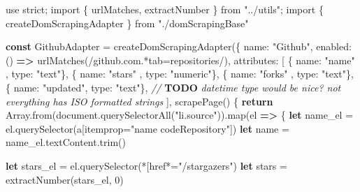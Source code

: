 \documentclass[sigplan,10pt,anonymous,review]{acmart}
\newenvironment{Shaded}{}{}
\newcommand{\AlertTok}[1]{\textcolor[rgb]{1.00,0.00,0.00}{\textbf{#1}}}
\newcommand{\AttributeTok}[1]{\textcolor[rgb]{0.49,0.56,0.16}{#1}}
\newcommand{\CommentTok}[1]{\textcolor[rgb]{0.38,0.63,0.69}{\textit{#1}}}
\newcommand{\ControlFlowTok}[1]{\textcolor[rgb]{0.00,0.44,0.13}{\textbf{#1}}}
\newcommand{\DataTypeTok}[1]{\textcolor[rgb]{0.56,0.13,0.00}{#1}}
\newcommand{\DecValTok}[1]{\textcolor[rgb]{0.25,0.63,0.44}{#1}}
\newcommand{\ImportTok}[1]{#1}
\newcommand{\KeywordTok}[1]{\textcolor[rgb]{0.00,0.44,0.13}{\textbf{#1}}}
\newcommand{\NormalTok}[1]{#1}
\newcommand{\OperatorTok}[1]{\textcolor[rgb]{0.40,0.40,0.40}{#1}}
\newcommand{\SpecialCharTok}[1]{\textcolor[rgb]{0.25,0.44,0.63}{#1}}
\newcommand{\SpecialStringTok}[1]{\textcolor[rgb]{0.73,0.40,0.53}{#1}}
\newcommand{\StringTok}[1]{\textcolor[rgb]{0.25,0.44,0.63}{#1}}
\newcommand{\VariableTok}[1]{\textcolor[rgb]{0.10,0.09,0.49}{#1}}
\begin{document}
\begin{Shaded}
\begin{Highlighting}[]
\StringTok{\textquotesingle{}use strict\textquotesingle{}}\OperatorTok{;}
\ImportTok{import} \OperatorTok{\{}\NormalTok{ urlMatches}\OperatorTok{,}\NormalTok{ extractNumber }\OperatorTok{\}} \ImportTok{from} \StringTok{"../utils"}\OperatorTok{;}
\ImportTok{import} \OperatorTok{\{}\NormalTok{ createDomScrapingAdapter }\OperatorTok{\}} \ImportTok{from} \StringTok{"./domScrapingBase"}

\KeywordTok{const}\NormalTok{ GithubAdapter }\OperatorTok{=} \AttributeTok{createDomScrapingAdapter}\NormalTok{(}\OperatorTok{\{}
  \DataTypeTok{name}\OperatorTok{:} \StringTok{"Github"}\OperatorTok{,}
  \DataTypeTok{enabled}\OperatorTok{:}\NormalTok{ () }\KeywordTok{=>} \AttributeTok{urlMatches}\NormalTok{(}\SpecialStringTok{/github.com.}\SpecialCharTok{*}\SpecialStringTok{tab=repositories/}\NormalTok{)}\OperatorTok{,}
  \DataTypeTok{attributes}\OperatorTok{:}\NormalTok{ [}
    \OperatorTok{\{} \DataTypeTok{name}\OperatorTok{:} \StringTok{"name"}   \OperatorTok{,} \DataTypeTok{type}\OperatorTok{:} \StringTok{"text"}\OperatorTok{\},}
    \OperatorTok{\{} \DataTypeTok{name}\OperatorTok{:} \StringTok{"stars"}  \OperatorTok{,} \DataTypeTok{type}\OperatorTok{:} \StringTok{"numeric"}\OperatorTok{\},}
    \OperatorTok{\{} \DataTypeTok{name}\OperatorTok{:} \StringTok{"forks"}  \OperatorTok{,} \DataTypeTok{type}\OperatorTok{:} \StringTok{"text"}\OperatorTok{\},}
    \OperatorTok{\{} \DataTypeTok{name}\OperatorTok{:} \StringTok{"updated"}\OperatorTok{,} \DataTypeTok{type}\OperatorTok{:} \StringTok{"text"}\OperatorTok{\},}
    \CommentTok{// }\AlertTok{TODO}\CommentTok{ datetime type would be nice? not everything has ISO formatted strings}
\NormalTok{  ]}\OperatorTok{,}
  \AttributeTok{scrapePage}\NormalTok{() }\OperatorTok{\{}
    \ControlFlowTok{return} \VariableTok{Array}\NormalTok{.}\AttributeTok{from}\NormalTok{(}\VariableTok{document}\NormalTok{.}\AttributeTok{querySelectorAll}\NormalTok{(}\StringTok{"li.source"}\NormalTok{)).}\AttributeTok{map}\NormalTok{(el }\KeywordTok{=>} \OperatorTok{\{}
      \KeywordTok{let}\NormalTok{ name\_el }\OperatorTok{=} \VariableTok{el}\NormalTok{.}\AttributeTok{querySelector}\NormalTok{(}\StringTok{\textquotesingle{}a[itemprop="name codeRepository"]\textquotesingle{}}\NormalTok{)}
      \KeywordTok{let}\NormalTok{ name }\OperatorTok{=} \VariableTok{name\_el}\NormalTok{.}\VariableTok{textContent}\NormalTok{.}\AttributeTok{trim}\NormalTok{()}

      \KeywordTok{let}\NormalTok{ stars\_el }\OperatorTok{=} \VariableTok{el}\NormalTok{.}\AttributeTok{querySelector}\NormalTok{(}\StringTok{\textquotesingle{}*[href*="/stargazers"\textquotesingle{}}\NormalTok{)}
      \KeywordTok{let}\NormalTok{ stars }\OperatorTok{=} \AttributeTok{extractNumber}\NormalTok{(stars\_el}\OperatorTok{,} \DecValTok{0}\NormalTok{)}


\end{Highlighting}
\end{Shaded}
\end{document}
